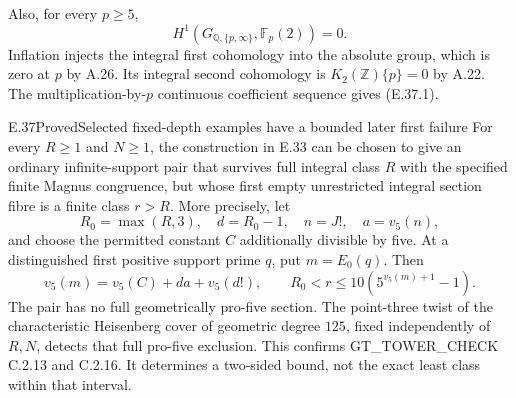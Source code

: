 Also, for every $p\ge5$,
\[
 H^1(G_{\mathbb Q,\{p,\infty\}},\mathbb F_p(2))=0.
 \tag{E.37.1}
\]
Inflation injects the integral first cohomology into the absolute
group, which is zero at $p$ by A.26.  Its integral second cohomology
is $K_2(\mathbb Z)\{p\}=0$ by A.22.  The multiplication-by-$p$
continuous coefficient sequence gives (E.37.1).

\begin{result}{E.37}{Proved}{Selected fixed-depth examples have a bounded later first failure}
\label{coh:selected-fixed-depth-failure}
For every $R\ge1$ and $N\ge1$, the construction in E.33 can be
chosen to give an ordinary infinite-support pair that survives
full integral class $R$ with the specified finite Magnus
congruence, but whose first empty unrestricted integral section
fibre is a finite class $r>R$.  More precisely, let
\[
 R_0=\max(R,3),\quad d=R_0-1,\quad n=J!,\quad
 a=v_5(n),
\]
and choose the permitted constant $C$ additionally divisible by
five.  At a distinguished first positive support prime $q$, put
$m=E_0(q)$.  Then
\[
 v_5(m)=v_5(C)+da+v_5(d!),\qquad
 R_0<r\le10(5^{v_5(m)+1}-1).
 \tag{E.37.2}
\]
The pair has no full geometrically pro-five section.  The
point-three twist of the characteristic Heisenberg cover of
geometric degree $125$, fixed independently of $R,N$, detects
that full pro-five exclusion.  This confirms GT\_TOWER\_CHECK
C.2.13 and C.2.16.  It determines a two-sided bound, not the
exact least class within that interval.
\end{result}
